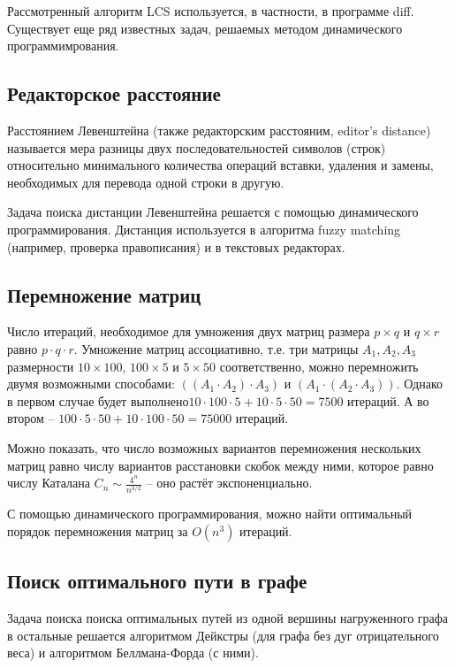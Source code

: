 \documentclass[11pt]{article}
\begin{document}
Рассмотренный алгоритм LCS используется, в частности, в программе diff. Существует еще ряд известных задач, решаемых методом динамического программимрования.

\subsection{Редакторское расстояние}

Расстоянием Левенштейна (также редакторским расстояним, editor's distance) называется мера разницы двух последовательностей символов (строк) относительно минимального количества операций вставки, удаления и замены, необходимых для перевода одной строки в другую.

Задача поиска дистанции Левенштейна решается с помощью динамического программирования. Дистанция используется в алгоритма fuzzy matching (например, проверка правописания) и в текстовых редакторах.

\subsection{Перемножение матриц}

Число итераций, необходимое для умножения двух матриц размера $p \times q$ и $q \times r$ равно $p \cdot q \cdot r$. Умножение матриц ассоциативно, т.е. три матрицы $A_1, A_2, A_3$ размерности $10 \times 100$, $100 \times 5$ и $5 \times 50$ соответственно, можно перемножить двумя возможными способами: $((A_1 \cdot A_2) \cdot A_3)$ и $(A_1 \cdot (A_2 \cdot A_3))$. Однако в первом случае будет выполнено$10 \cdot 100 \cdot 5 + 10 \cdot 5 \cdot 50 = 7500$ итераций. А во втором -- $100 \cdot 5 \cdot 50 + 10 \cdot 100 \cdot 50 = 75000$ итераций.

Можно показать, что число возможных вариантов перемножения нескольких матриц равно числу вариантов расстановки скобок между ними, которое равно числу Каталана $C_n \sim \frac{4^n}{n^{3/2}}$ -- оно растёт экспоненциально.

С помощью динамического программирования, можно найти оптимальный порядок перемножения матриц за $O(n^3)$ итераций.

\subsection{Поиск оптимального пути в графе}

Задача поиска поиска оптимальных путей из одной вершины нагруженного графа в остальные решается алгоритмом Дейкстры (для графа без дуг отрицательного веса) и алгоритмом Беллмана-Форда (с ними). 
\end{document}

